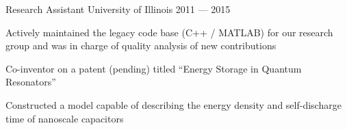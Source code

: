 \begin{cventries}
  \cventry%
  {Research Assistant} %
  {University of Illinois}
  {\color{awesome}{Center for Complex Systems Research}} %
  {2011 --- 2015}
  {
  \begin{cvitems}%
    \item{Actively maintained the legacy code base (C++ / MATLAB) for our
      research group and was in charge of quality analysis of new
      contributions}
    \item{Co-inventor on a patent (pending) titled ``Energy Storage in Quantum
        Resonators''}
    \item{Constructed a model capable of describing the energy density and
      self-discharge time of nanoscale capacitors}
  \end{cvitems}%
  }

\end{cventries}
